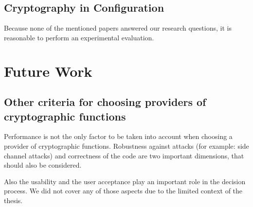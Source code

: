 	\subsection{Cryptography in Configuration}

Because none of the mentioned papers answered our research questions, it is reasonable to perform an experimental evaluation.

\section{Future Work}

	\subsection{Other criteria for choosing providers of cryptographic functions}

Performance is not the only factor to be taken into account when choosing a provider of cryptographic functions.
Robustness against attacks (for example: side channel attacks) and correctness of the code are two important dimensions, that should also be considered.

Also the usability and the user acceptance play an important role in the decision process.
We did not cover any of those aspects due to the limited context of the thesis.

